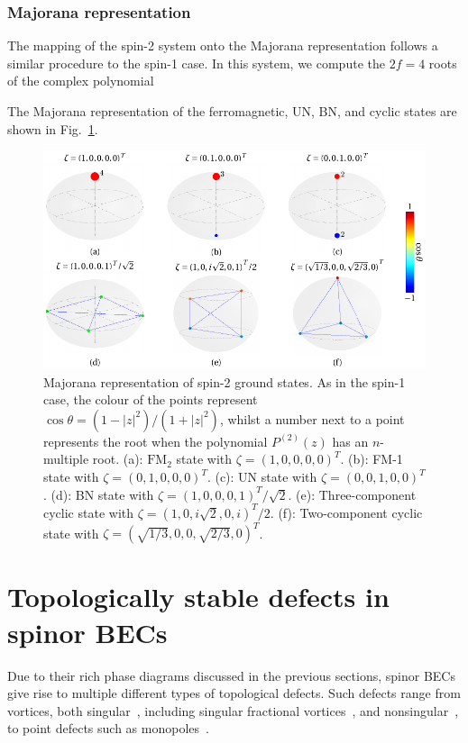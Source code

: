 \subsubsection{Majorana representation}
The mapping of the spin-2 system onto the Majorana representation follows a
similar procedure to the spin-1 case.
In this system, we compute the \(2f=4\) roots of the complex polynomial

The Majorana representation of the ferromagnetic, UN, BN, and cyclic states
are shown in Fig.~\ref{fig: spin-2-Majorana}.
\begin{figure}
    \centering
    \includegraphics{gfx/ch-groundStateSymmetries/spin-2-majorana.pdf}
    \caption[Majorana representation of spin-2 ground states]
    {\label{fig: spin-2-Majorana}Majorana representation of spin-2 ground
    states.
    As in the spin-1 case, the colour of the points represent \(\cos\theta =
    (1-|z|^2)/(1+|z|^2)\), whilst a number next to a point represents the root
    when the polynomial \(P^{(2)}(z)\) has an \(n\)-multiple root.
    (a): \(\text{FM}_2\) state with \(\zeta={(1, 0, 0, 0, 0)}^T\).
    (b): FM-1 state with \(\zeta={(0, 1, 0, 0, 0)}^T\).
    (c): UN state with \(\zeta={(0, 0, 1, 0, 0)}^T\).
    (d): BN state with \(\zeta={(1, 0, 0, 0, 1)}^T/\sqrt{2}\).
    (e): Three-component cyclic state with
    \(\zeta={(1, 0, i\sqrt{2}, 0, i)}^T/2\).
    (f): Two-component cyclic state with
    \(\zeta={(\sqrt{1/3}, 0, 0, \sqrt{2/3}, 0)}^T\).}
\end{figure}

\section{Topologically stable defects in spinor BECs}
Due to their rich phase diagrams discussed in the previous sections, spinor BECs
give rise to multiple different types of topological defects.
Such defects range from vortices, both singular~\cite{Yip1999,Isoshima2002,
Mizushima2002, Sadler2006,Semenoff2007,Lovegrove2012,Lovegrove2016,
Borgh2016,Weiss2019,Xiao2021,Xiao2022}, including singular
fractional vortices~\cite{Leonhardt2000, Zhou2003,Ji2008,Seo2015,Semenoff2007,
Kobayashi2009,Lovegrove2012, Lovegrove2016,Borgh2016,Borgh2017,Xiao2021,
Xiao2022}, and nonsingular~\cite{Ohmi1998, Ho1998, Mizushima2002a,
Martikainen2002, Leanhardt2003, Mizushima2004, Choi2012, Choi2012a,
Lovegrove2014,Weiss2019}, to point defects such as monopoles~\cite{Stoof2001,
Savage2003,Ruostekoski2003, Pietila2009,Ray2014,Ray2015,Ollikainen2017,
Mithun2022}.

